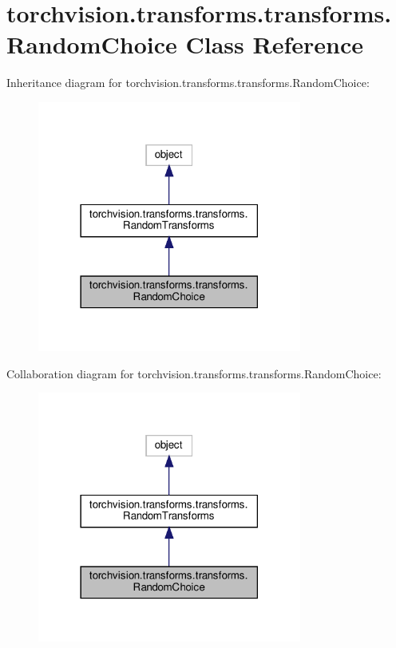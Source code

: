 \hypertarget{classtorchvision_1_1transforms_1_1transforms_1_1RandomChoice}{}\section{torchvision.\+transforms.\+transforms.\+Random\+Choice Class Reference}
\label{classtorchvision_1_1transforms_1_1transforms_1_1RandomChoice}


Inheritance diagram for torchvision.\+transforms.\+transforms.\+Random\+Choice\+:
\nopagebreak
\begin{figure}[H]
\begin{center}
\leavevmode
\includegraphics[width=246pt]{classtorchvision_1_1transforms_1_1transforms_1_1RandomChoice__inherit__graph}
\end{center}
\end{figure}


Collaboration diagram for torchvision.\+transforms.\+transforms.\+Random\+Choice\+:
\nopagebreak
\begin{figure}[H]
\begin{center}
\leavevmode
\includegraphics[width=246pt]{classtorchvision_1_1transforms_1_1transforms_1_1RandomChoice__coll__graph}
\end{center}
\end{figure}

